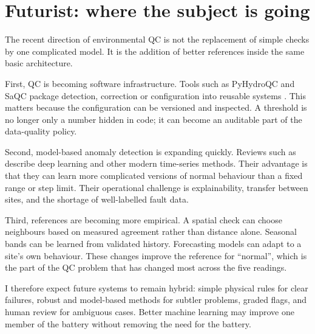 \clearpage
\section{Futurist: where the subject is going}
\label{sec:future}

The recent direction of environmental QC is not the replacement of simple
checks by one complicated model. It is the addition of better references
inside the same basic architecture.

First, QC is becoming software infrastructure. Tools such as PyHydroQC and
SaQC package detection, correction or configuration into reusable systems
\citep{jones2022,schmidt2023}. This matters because the configuration can
be versioned and inspected. A threshold is no longer only a number hidden in
code; it can become an auditable part of the data-quality policy.

Second, model-based anomaly detection is expanding quickly. Reviews such as
\citet{blazquez2021} describe deep learning and other modern time-series
methods. Their advantage is that they can learn more complicated versions of
normal behaviour than a fixed range or step limit. Their operational
challenge is explainability, transfer between sites, and the shortage of
well-labelled fault data.

Third, references are becoming more empirical. A spatial check can choose
neighbours based on measured agreement rather than distance alone. Seasonal
bands can be learned from validated history. Forecasting models can adapt to
a site's own behaviour. These changes improve the reference for ``normal'',
which is the part of the QC problem that has changed most across the five
readings.

I therefore expect future systems to remain hybrid: simple physical rules for
clear failures, robust and model-based methods for subtler problems, graded
flags, and human review for ambiguous cases. Better machine learning may
improve one member of the battery without removing the need for the battery.

